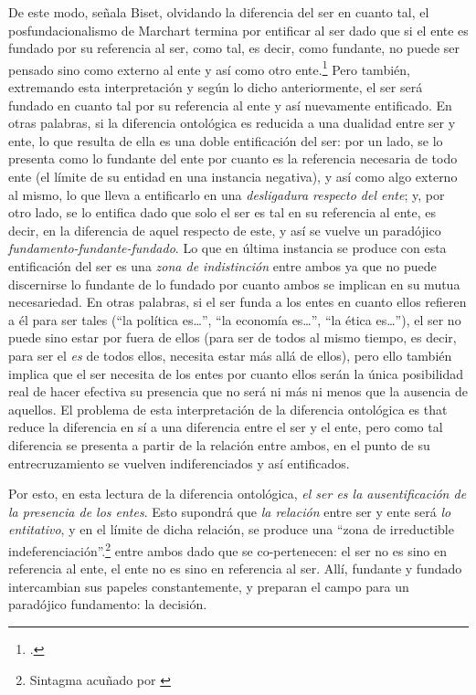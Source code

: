 De este modo, señala Biset, olvidando la diferencia del ser en cuanto tal, el posfundacionalismo de Marchart termina por entificar al ser dado que si el ente es fundado por su referencia al ser,  \linebreak como tal, es decir, como fundante, no puede ser pensado sino como externo al ente y así como otro ente.\footcite[195]{@7074-BISET2010} Pero también, extremando esta interpretación y según lo dicho anteriormente, el ser será fundado en cuanto tal por su referencia al ente y así nuevamente entificado. En otras palabras, si la diferencia ontológica es reducida a una dualidad entre ser y ente, lo que resulta de ella es una doble entificación del ser: por un lado, se lo presenta como lo fundante del ente por cuanto es la referencia necesaria de todo ente (el límite de su entidad en una instancia negativa), y así como algo externo al mismo, lo que lleva a entificarlo en una \emph{desligadura respecto del ente}; y, por otro lado, se lo entifica dado que solo el ser es tal en su referencia al ente, es decir, en la diferencia de aquel respecto de este, y así se vuelve un paradójico \emph{fundamento-fundante-fundado}. Lo que en última instancia se produce con esta entificación del ser es una \emph{zona de indistinción} entre ambos ya que no puede discernirse lo fundante de lo fundado por cuanto ambos se implican en su mutua necesariedad. En otras palabras, si el ser funda a los entes en cuanto ellos refieren a él para ser tales (\enquote{la política es\ldots}, \enquote{la economía es\ldots}, \enquote{la ética es\ldots}), el ser no puede sino estar por fuera de ellos (para ser de todos al mismo tiempo, es decir, para ser el \emph{es} de todos ellos, necesita estar más allá de ellos), pero ello también implica que el ser necesita de los entes por cuanto ellos serán la única posibilidad real de hacer efectiva su presencia que no será ni más ni menos que la ausencia de aquellos. El problema de esta interpretación de la diferencia ontológica es that reduce la diferencia en sí a una diferencia entre el ser y el ente, pero como tal diferencia se presenta a partir de la relación entre ambos, en el punto de su entrecruzamiento se vuelven indiferenciados y así entificados.

Por esto, en esta lectura de la diferencia ontológica, \emph{el ser es la ausentificación de la presencia de los entes}. Esto supondrá que \emph{la relación} entre ser y ente será \emph{lo entitativo}, y en el límite de dicha relación, se produce una \enquote{zona de irreductible indeferenciación}.\footnote{Sintagma acuñado por \cite[19]{@7101-AGAMBEN2003}} entre ambos dado que se co-pertenecen: el ser no es sino en referencia al ente, el ente no es sino en referencia al ser. Allí, fundante y fundado intercambian sus papeles constantemente, y preparan el campo para un paradójico fundamento: la decisión.

